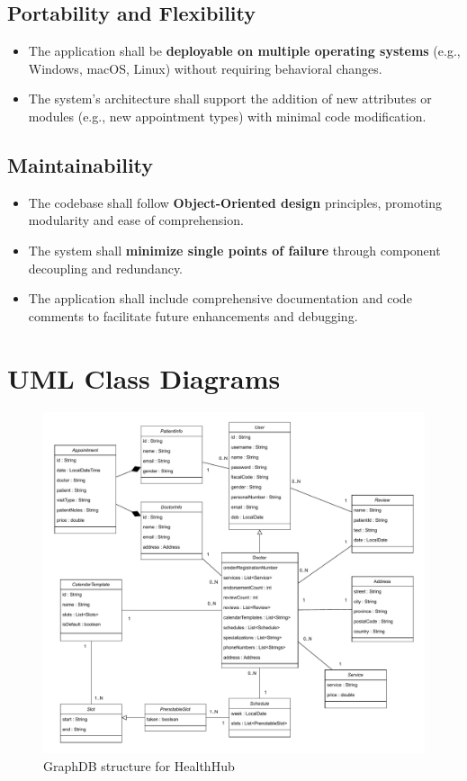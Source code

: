 \subsection{Portability and Flexibility}
\begin{itemize}
	\item The application shall be \textbf{deployable on multiple operating systems} (e.g., Windows, macOS, Linux) without requiring behavioral changes.
	\item The system’s architecture shall support the addition of new attributes or modules (e.g., new appointment types) with minimal code modification.
\end{itemize}

\subsection{Maintainability}
\begin{itemize}
	\item The codebase shall follow \textbf{Object-Oriented design} principles, promoting modularity and ease of comprehension.
	\item The system shall \textbf{minimize single points of failure} through component decoupling and redundancy.
	\item The application shall include comprehensive documentation and code comments to facilitate future enhancements and debugging.
\end{itemize}

\section{UML Class Diagrams}
\begin{figure}[!h]
    \centering
	\includegraphics[scale=0.69]{./resources/healthhub_UML.pdf}
    \caption{GraphDB structure for HealthHub}
    \label{fig:uml-diagram}
\end{figure}

